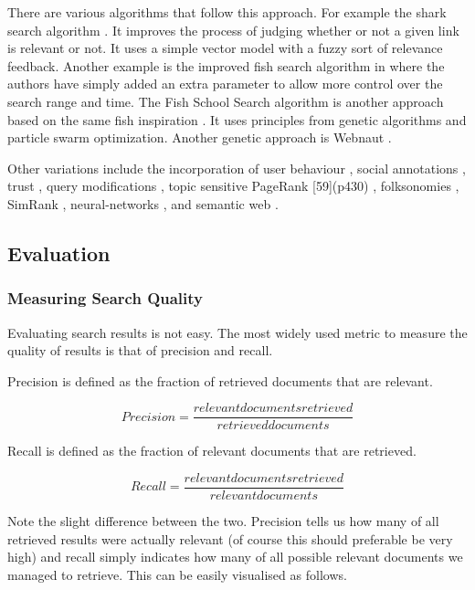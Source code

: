 There are various algorithms that follow this approach. For example the shark search algorithm \citep{Hersovici1998}. It improves the process of judging whether or not a given link is relevant or not. It uses a simple vector model with a fuzzy sort of relevance feedback. Another example is the improved fish search algorithm in \citep{Luo2005} where the authors have simply added an extra parameter to allow more control over the search range and time. The Fish School Search algorithm is another approach based on the same fish inspiration \citep{BastosFilho2008}. It uses principles from genetic algorithms and particle swarm optimization. Another genetic approach is Webnaut \citep{Nick2001}.

Other variations include the incorporation of user behaviour \citep{Agichtein2006}, social annotations \citep{Bao2007}, trust \citep{Garcia-Molina2004}, query modifications \citep{Glover2001}, topic sensitive PageRank [59](p430) \citep{Haveliwala2003}, folksonomies \citep{Hotho}, SimRank \citep{Jeh}, neural-networks \citep{Shu1999}, and semantic web \citep{Widyantoro2001,Du2007,Ding,Kamps,Taye2009}.

\subsection{Evaluation}

\subsubsection{Measuring Search Quality}

Evaluating search results is not easy. The most widely used metric to measure the quality of results is that of precision and recall.

Precision is defined as the fraction of retrieved documents that are relevant.

\begin{equation}
  Precision = \frac{relevant documents retrieved}{retrieved documents}
\end{equation}

Recall is defined as the fraction of relevant documents that are retrieved.

\begin{equation}
  Recall = \frac{relevant documents retrieved}{relevant documents}
\end{equation}

Note the slight difference between the two. Precision tells us how many of all retrieved results were actually relevant (of course this should preferable be very high) and recall simply indicates how many of all possible relevant documents we managed to retrieve. This can be easily visualised as follows.

